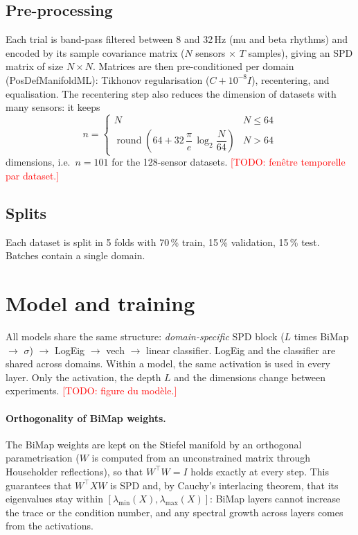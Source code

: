 \documentclass[11pt,a4paper]{article}
\newcommand{\todo}[1]{\textcolor{red}{[TODO: #1]}}
\begin{document}
\subsection{Pre-processing}
\label{sec:preproc}
Each trial is band-pass filtered between 8 and 32\,Hz (mu and beta rhythms) and encoded by
its sample covariance matrix ($N$ sensors $\times$ $T$ samples), giving an SPD matrix of
size $N \times N$.
Matrices are then pre-conditioned per domain (PosDefManifoldML): Tikhonov regularisation
($C + 10^{-8} I$), recentering, and equalisation. The recentering step also reduces the
dimension of datasets with many sensors: it keeps
\begin{equation}
  n = \begin{cases} N & N \leq 64 \\[1mm]
  \operatorname{round}\!\left(64 + 32\,\dfrac{\pi}{e}\,\log_2 \dfrac{N}{64}\right) & N > 64
  \end{cases}
\end{equation}
dimensions, i.e.\ $n = 101$ for the 128-sensor datasets.
\todo{fenêtre temporelle par dataset.}

\subsection{Splits}
Each dataset is split in 5 folds with 70\,\% train, 15\,\% validation, 15\,\% test.
Batches contain a single domain.

\section{Model and training}
\label{sec:model}

All models share the same structure:
\emph{domain-specific} SPD block ($L$ times BiMap $\rightarrow$ $\sigma$)
$\rightarrow$ LogEig $\rightarrow$ vech $\rightarrow$ linear classifier.
LogEig and the classifier are shared across domains. Within a model, the same activation is
used in every layer. Only the activation, the depth $L$ and the dimensions change between
experiments.
\todo{figure du modèle.}

\paragraph{Orthogonality of BiMap weights.}
The BiMap weights are kept on the Stiefel manifold by an orthogonal parametrisation
($W$ is computed from an unconstrained matrix through Householder reflections), so that
$W^\top W = I$ holds exactly at every step. This guarantees that $W^\top X W$ is SPD and,
by Cauchy's interlacing theorem, that its eigenvalues stay within
$[\lambda_{\min}(X), \lambda_{\max}(X)]$: BiMap layers cannot increase the trace or the
condition number, and any spectral growth across layers comes from the activations.
\end{document}
